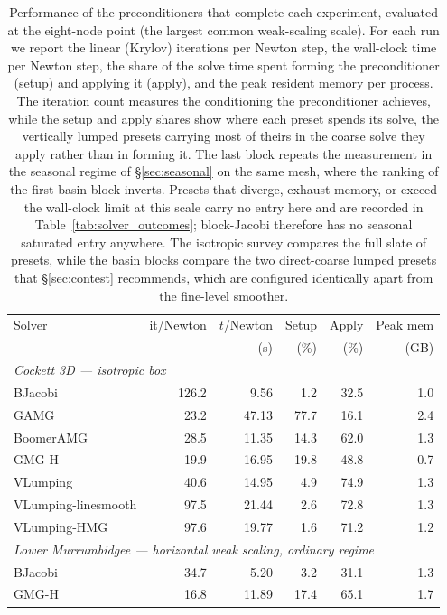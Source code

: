 \begin{table}[t]
\caption{Performance of the preconditioners that complete each experiment, evaluated at the eight-node point (the largest common weak-scaling scale). For each run we report the linear (Krylov) iterations per Newton step, the wall-clock time per Newton step, the share of the solve time spent forming the preconditioner (setup) and applying it (apply), and the peak resident memory per process. The iteration count measures the conditioning the preconditioner achieves, while the setup and apply shares show where each preset spends its solve, the vertically lumped presets carrying most of theirs in the coarse solve they apply rather than in forming it. The last block repeats the measurement in the seasonal regime of \S\ref{sec:seasonal} on the same mesh, where the ranking of the first basin block inverts. Presets that diverge, exhaust memory, or exceed the wall-clock limit at this scale carry no entry here and are recorded in Table~\ref{tab:solver_outcomes}; block-Jacobi therefore has no seasonal saturated entry anywhere. The isotropic survey compares the full slate of presets, while the basin blocks compare the two direct-coarse lumped presets that \S\ref{sec:contest} recommends, which are configured identically apart from the fine-level smoother.}
\label{tab:solver_performance}
\begin{tabular}{lrrrrr}
\hline
Solver & it/Newton & \multicolumn{1}{c}{$t$/Newton} & Setup & Apply & Peak mem \\
 & & (s) & (\%) & (\%) & (GB) \\
\hline
\multicolumn{6}{l}{\textit{Cockett 3D --- isotropic box}} \\
BJacobi & 126.2 & 9.56 & 1.2 & 32.5 & 1.0 \\
GAMG & 23.2 & 47.13 & 77.7 & 16.1 & 2.4 \\
BoomerAMG & 28.5 & 11.35 & 14.3 & 62.0 & 1.3 \\
GMG-H & 19.9 & 16.95 & 19.8 & 48.8 & 0.7 \\
VLumping & 40.6 & 14.95 & 4.9 & 74.9 & 1.3 \\
VLumping-linesmooth & 97.5 & 21.44 & 2.6 & 72.8 & 1.3 \\
VLumping-HMG & 97.6 & 19.77 & 1.6 & 71.2 & 1.2 \\
\hline
\multicolumn{6}{l}{\textit{Lower Murrumbidgee --- horizontal weak scaling, ordinary regime}} \\
BJacobi & 34.7 & 5.20 & 3.2 & 31.1 & 1.3 \\
GMG-H & 16.8 & 11.89 & 17.4 & 65.1 & 1.7 \\

\end{tabular}
\end{table}
